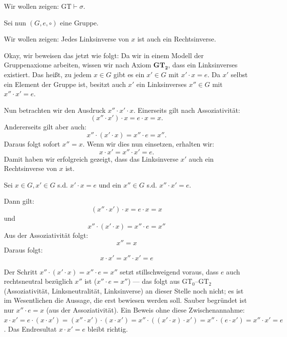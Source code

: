 \begin{math-stroke}

Wir wollen zeigen: $\text{GT} \vdash \sigma$.

Sei nun $(G, e, \circ)$ eine Gruppe.

Wir wollen zeigen: Jedes Linksinverse von $x$ ist auch ein Rechtsinverse.
\end{math-stroke}

\begin{spoken-clean}[00:53:36 - 00:57:27]
Okay, wir beweisen das jetzt wie folgt: Da wir in einem Modell der Gruppenaxiome arbeiten, wissen wir nach Axiom $\textbf{GT}_\textbf{2}$, dass ein Linksinverses existiert. Das heißt, zu jedem $x \in G$ gibt es ein $x' \in G$ mit $x' \cdot x = e$. Da $x'$ selbst ein Element der Gruppe ist, besitzt auch $x'$ ein Linksinverses $x'' \in G$ mit $x'' \cdot x' = e$.

Nun betrachten wir den Ausdruck $x'' \cdot x' \cdot x$. Einerseits gilt nach Assoziativität:
\[ (x'' \cdot x') \cdot x = e \cdot x = x. \]
Andererseits gilt aber auch:
\[ x'' \cdot (x' \cdot x) = x'' \cdot e = x''. \]
Daraus folgt sofort $x'' = x$. Wenn wir dies nun einsetzen, erhalten wir:
\[ x \cdot x' = x'' \cdot x' = e. \]
Damit haben wir erfolgreich gezeigt, dass das Linksinverse $x'$ auch ein Rechtsinverse von $x$ ist.
\end{spoken-clean}

\begin{math-stroke}
\begin{short-proof}
Sei $x \in G, x' \in G$ s.d. $x' \cdot x = e$ und ein $x'' \in G$ s.d. $x'' \cdot x' = e$.

Dann gilt:
\[ (x'' \cdot x') \cdot x = e \cdot x = x \]
und
\[ x'' \cdot (x' \cdot x) = x'' \cdot e = x'' \]
Aus der Assoziativität folgt:
\[ x'' = x \]
Daraus folgt:
\[ x \cdot x' = x'' \cdot x' = e \]
\end{short-proof}
\end{math-stroke}

\begin{ai-note}
Der Schritt $x''\cdot(x'\cdot x) = x''\cdot e = x''$ setzt stillschweigend voraus, dass $e$ auch rechtsneutral bezüglich $x''$ ist ($x''\cdot e = x''$) --- das folgt aus $\text{GT}_0$--$\text{GT}_2$ (Assoziativität, Linksneutralität, Linksinverse) an dieser Stelle noch nicht; es ist im Wesentlichen die Aussage, die erst bewiesen werden soll. Sauber begründet ist nur $x''\cdot e = x$ (aus der Assoziativität). Ein Beweis ohne diese Zwischenannahme: $x\cdot x' = e\cdot(x\cdot x') = (x''\cdot x')\cdot(x\cdot x') = x''\cdot((x'\cdot x)\cdot x') = x''\cdot(e\cdot x') = x''\cdot x' = e$. Das Endresultat $x\cdot x'=e$ bleibt richtig.
\end{ai-note}

